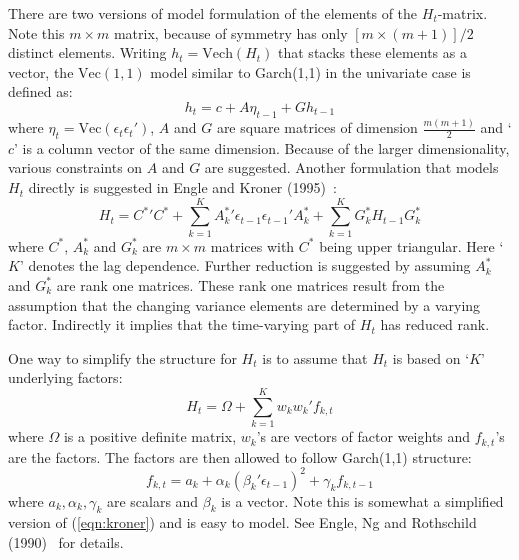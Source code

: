 There are two versions of model formulation of the elements of the $H_t$-matrix. Note this $m \times m$ matrix, because of symmetry has only $[m \times (m+1)]/2$ distinct elements. Writing $h_t=\text{Vech}(H_t)$ that stacks these elements as a vector, the $\text{Vec}(1,1)$ model similar to Garch(1,1) in the univariate case is defined as:
	\begin{equation}\label{eqn:vecmodel}
	h_t= c + A \eta_{t-1} + G h_{t-1}
	\end{equation}
where $\eta_t=\text{Vec}(\epsilon_t \epsilon_t')$, $A$ and $G$ are square matrices of dimension $\frac{m(m+1)}{2}$ and `$c$' is a column vector of the same dimension. Because of the larger dimensionality, various constraints on $A$ and $G$ are suggested. Another formulation that models $H_t$ directly is suggested in Engle and Kroner (1995)~\cite{kroner}:
	\begin{equation}\label{eqn:kroner}
	H_t=C^*\prime C^* + \sum_{k=1}^K A_k^*\prime \epsilon_{t-1} \epsilon_{t-1}' A_k^* + \sum_{k=1}^K G_k^* H_{t-1}G_k^*
	\end{equation}
where $C^*$, $A_k^*$ and $G_k^*$ are $m \times m$ matrices with $C^*$ being upper triangular. Here `$K$' denotes the lag dependence. Further reduction is suggested by assuming $A_k^*$ and $G_k^*$ are rank one matrices. These rank one matrices result from the assumption that the changing variance elements are determined by a varying factor. Indirectly it implies that the time-varying part of $H_t$ has reduced rank. 


One way to simplify the structure for $H_t$ is to assume that $H_t$ is based on `$K$' underlying factors:
	\begin{equation}\label{eqn:factorH}
	H_t= \Omega + \sum_{k=1}^K w_k w_k' f_{k,t}
	\end{equation}
where $\Omega$ is a positive definite matrix, $w_k$'s are vectors of factor weights and $f_{k,t}$'s are the factors. The factors are then allowed to follow Garch(1,1) structure:
	\begin{equation}\label{eqn:garchfactor}
	f_{k,t}= a_k + \alpha_k \left(\beta_k' \epsilon_{t-1}\right)^2 + \gamma_k f_{k,t-1}
	\end{equation}
where $a_k,\alpha_k,\gamma_k$ are scalars and $\beta_k$ is a vector. Note this is somewhat a simplified version of (\ref{eqn:kroner}) and is easy to model. See Engle, Ng and Rothschild (1990)~\cite{engleng} for details. 


